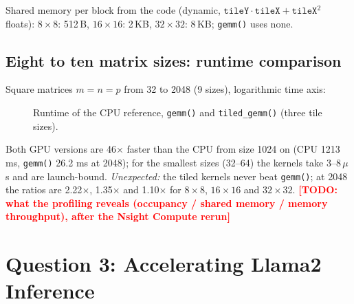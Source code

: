 \documentclass[11pt,a4paper]{article}
\newcommand{\todo}[1]{\textcolor{red}{\textbf{[TODO: #1]}}}
\begin{document}
Shared memory per block from the code (dynamic, $\texttt{tileY}\cdot\texttt{tileX}+\texttt{tileX}^2$ floats):
$8\times8$: 512\,B, $16\times16$: 2\,KB, $32\times32$: 8\,KB; \texttt{gemm()} uses none.

\subsection{Eight to ten matrix sizes: runtime comparison}
Square matrices $m=n=p$ from 32 to 2048 (9 sizes), logarithmic time axis:
\begin{figure}[h]
\centering
{}
\caption{Runtime of the CPU reference, \texttt{gemm()} and \texttt{tiled\_gemm()} (three tile sizes).}
\end{figure}

Both GPU versions are 46$\times$ faster than the CPU from size 1024 on (CPU 1213 ms, \texttt{gemm()} 26.2 ms at
2048); for the smallest sizes (32--64) the kernels take 3--8\,$\mu$s and are launch-bound. \emph{Unexpected:} the
tiled kernels never beat \texttt{gemm()}; at 2048 the ratios are 2.22$\times$, 1.35$\times$ and 1.10$\times$ for
$8\times8$, $16\times16$ and $32\times32$.
\todo{what the profiling reveals (occupancy / shared memory / memory throughput), after the Nsight Compute rerun}

\section{Question 3: Accelerating Llama2 Inference}
\end{document}
